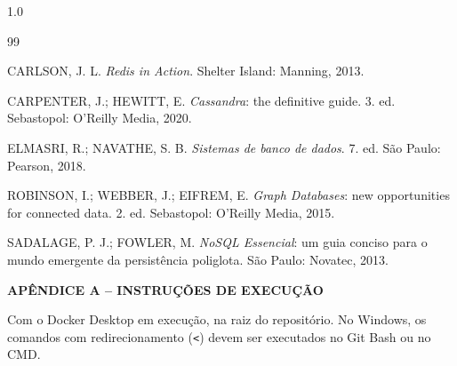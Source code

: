 \documentclass[12pt,a4paper,oneside]{article}
\begin{document}
\begingroup
\setlength{\parindent}{0pt}
\raggedright
\begin{spacing}{1.0}
\renewcommand{\refname}{}
\makeatletter
\let\oldbibitem\bibitem
\renewcommand{\bibitem}[1]{\oldbibitem{#1}\vspace{8pt}}
\makeatother

\begin{thebibliography}{99}
\vspace{-10pt}

CARLSON, J. L. \textit{Redis in Action}. Shelter Island: Manning, 2013.

CARPENTER, J.; HEWITT, E. \textit{Cassandra}: the definitive guide. 3. ed. Sebastopol: O'Reilly Media, 2020.

ELMASRI, R.; NAVATHE, S. B. \textit{Sistemas de banco de dados}. 7. ed. São Paulo: Pearson, 2018.

ROBINSON, I.; WEBBER, J.; EIFREM, E. \textit{Graph Databases}: new opportunities for connected data. 2. ed. Sebastopol: O'Reilly Media, 2015.

SADALAGE, P. J.; FOWLER, M. \textit{NoSQL Essencial}: um guia conciso para o mundo emergente da persistência poliglota. São Paulo: Novatec, 2013.

\end{thebibliography}
\end{spacing}
\endgroup

\newpage
{}
{}
\begin{center}{\bfseries\MakeUppercase{Apêndice A -- Instruções de execução}}\end{center}
\vspace{\baselineskip}

Com o Docker Desktop em execução, na raiz do repositório. No Windows, os comandos com redirecionamento (\texttt{<}) devem ser executados no Git Bash ou no CMD.
\end{document}
